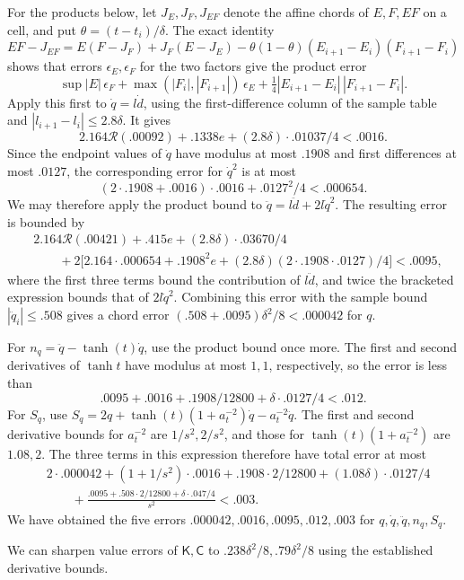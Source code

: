 For the products below, let $J_E,J_F,J_{EF}$ denote the affine chords of $E,F,EF$ on a cell, and put $\theta=(t-t_i)/\delta$. The exact identity
\[
 EF-J_{EF}
 =E(F-J_F)+J_F(E-J_E)
  -\theta(1-\theta)(E_{i+1}-E_i)(F_{i+1}-F_i)
\]
shows that errors $\epsilon_E,\epsilon_F$ for the two factors give the product error
\[
 \sup|E|\,\epsilon_F+
 \max(|F_i|,|F_{i+1}|)\,\epsilon_E+
 \tfrac14|E_{i+1}-E_i|\,|F_{i+1}-F_i|.
\]
Apply this first to $\dot q=l\dot d$, using the first-difference column of the sample table and $|l_{i+1}-l_i|\le2.8\delta$. It gives
\[
 2.164\mathcal{R}(.00092)+.1338e+
       (2.8\delta)\cdot.01037/4<.0016.
\]
Since the endpoint values of $\dot q$ have modulus at most $.1908$ and first differences at most $.0127$, the corresponding error for $\dot q^2$ is at most
\[
 (2\cdot.1908+.0016)\cdot.0016+.0127^2/4<.000654.
\]
We may therefore apply the product bound to $\ddot q=l\ddot d+2l\dot q^2$. The resulting error is bounded by
\[
 \begin{aligned}
 &2.164\mathcal{R}(.00421)+.415 e+(2.8\delta)\cdot.03670/4\\
 &\qquad{}+2\big[2.164\cdot.000654+.1908^2 e
       +(2.8\delta)(2\cdot.1908\cdot.0127)/4\big]<.0095,
 \end{aligned}
\]
where the first three terms bound the contribution of $l\ddot d$, and twice the bracketed expression bounds that of $2l\dot q^2$. Combining this error with the sample bound $|\ddot q_i|\le.508$ gives a chord error $(.508+.0095)\delta^2/8<.000042$ for $q$.

For $n_q=\ddot q-\tanh(t)\dot q$, use the product bound once more. The first and second derivatives of $\tanh t$ have modulus at most $1,1$, respectively, so the error is less than
\[
 .0095+.0016+.1908/12800+\delta\cdot.0127/4<.012.
\]
For $S_q$, use $S_q=2q+\tanh(t)(1+a_t^{-2})\dot q-a_t^{-2}\ddot q$. The first and second derivative bounds for $a_t^{-2}$ are $1/s^2,2/s^2$, and those for $\tanh(t)(1+a_t^{-2})$ are $1.08,2$. The three terms in this expression therefore have total error at most
\[
 \begin{aligned}
 &2\cdot.000042+(1+1/s^2)\cdot.0016+
 .1908\cdot2/12800+(1.08\delta)\cdot.0127/4\\
 &\qquad{}+\frac{.0095+.508\cdot2/12800+\delta\cdot.047/4}{s^2}<.003.
 \end{aligned}
\]
We have obtained the five errors $.000042,.0016,.0095,.012,.003$ for $q,\dot q,\ddot q,n_q,S_q$.

We can sharpen value errors of $\mathsf K,\mathsf C$ to $.238\delta^2/8,.79\delta^2/8$ using the established derivative bounds.

